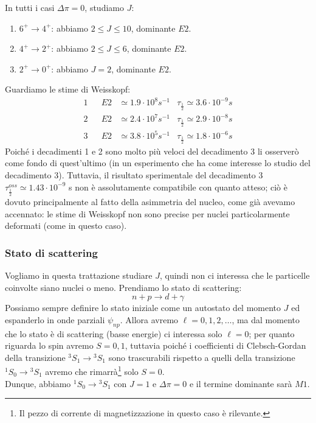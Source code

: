 \noindent In tutti i casi $\Delta\pi =0 $, studiamo $J$:
\begin{enumerate}[1.]
    \item $6^+\to4^+$: abbiamo $2\leq J \leq 10$, dominante $E2$.
    \item $4^+\to2^+$: abbiamo $2\leq J \leq 6$, dominante $E2$.
    \item $2^+\to0^+$: abbiamo $J=2$, dominante $E2$.
\end{enumerate}
Guardiamo le stime di Weisskopf:
\begin{displaymath}
\begin{aligned}
1& & E2&\simeq 1.9 \cdot 10^8 \unit{s}^{-1} & \tau_{\frac{1}{2}} \simeq 3.6 \cdot 10^{-9} \unit{s} \\
2& & E2&\simeq 2.4 \cdot 10^7 \unit{s}^{-1} & \tau_{\frac{1}{2}} \simeq 2.9 \cdot 10^{-8} \unit{s} \\
3& & E2&\simeq 3.8 \cdot 10^5 \unit{s}^{-1} & \tau_{\frac{1}{2}} \simeq 1.8 \cdot 10^{-6} \unit{s} 
\end{aligned}
\end{displaymath}
Poiché i decadimenti 1 e 2 sono molto più veloci del decadimento 3 li osserverò come fondo di quest'ultimo (in un esperimento che ha come interesse lo studio del decadimento 3). Tuttavia, il risultato sperimentale del decadimento 3 $\tau_{\frac{1}{2}}^{oss}\simeq 1.43\cdot10^{-9}$ s non è assolutamente compatibile con quanto atteso; ciò è dovuto principalmente al fatto della asimmetria del nucleo, come già avevamo accennato: le stime di Weisskopf non sono precise per nuclei particolarmente deformati (come in questo caso).

\subsubsection{Stato di scattering}
Vogliamo in questa trattazione studiare $J$, quindi non ci interessa che le particelle coinvolte siano nuclei o meno. Prendiamo lo stato di scattering:
$$n+p \to d + \gamma$$
Possiamo sempre definire lo stato iniziale come un autostato del momento $J$ ed espanderlo in onde parziali $\psi_{np}$. Allora avremo $\ell = 0,1,2,\dots$, ma dal momento che lo stato è di scattering (basse energie) ci interessa solo $\ell=0$; per quanto riguarda lo spin avremo $S=0,1$, tuttavia poiché i coefficienti di Clebsch-Gordan della transizione ${^3S_1}\to {^3S_1}$ sono trascurabili rispetto a quelli della transizione ${^1S_0}\to {^3S_1}$ avremo che rimarrà\footnote{Il pezzo di corrente di magnetizzazione in questo caso è rilevante.} solo $S=0$.\\
Dunque, abbiamo ${^1S_0}\to {^3S_1}$ con $J=1$ e $\Delta\pi  = 0$ e il termine dominante sarà $M1$.
